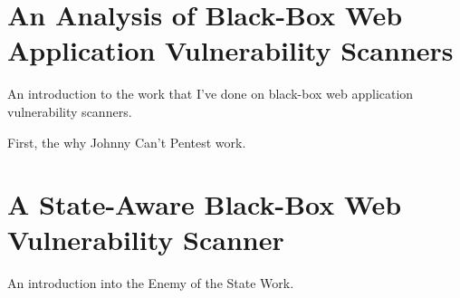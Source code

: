\chapter{An Analysis of Black-Box Web Application Vulnerability Scanners}
\label{why-johnny-cant-pentest}

An introduction to the work that I've done on black-box web
application vulnerability scanners.

First, the why Johnny Can't Pentest work.



\chapter{A State-Aware Black-Box Web Vulnerability Scanner}
\label{enemy-of-the-state}
An introduction into the Enemy of the State Work.

